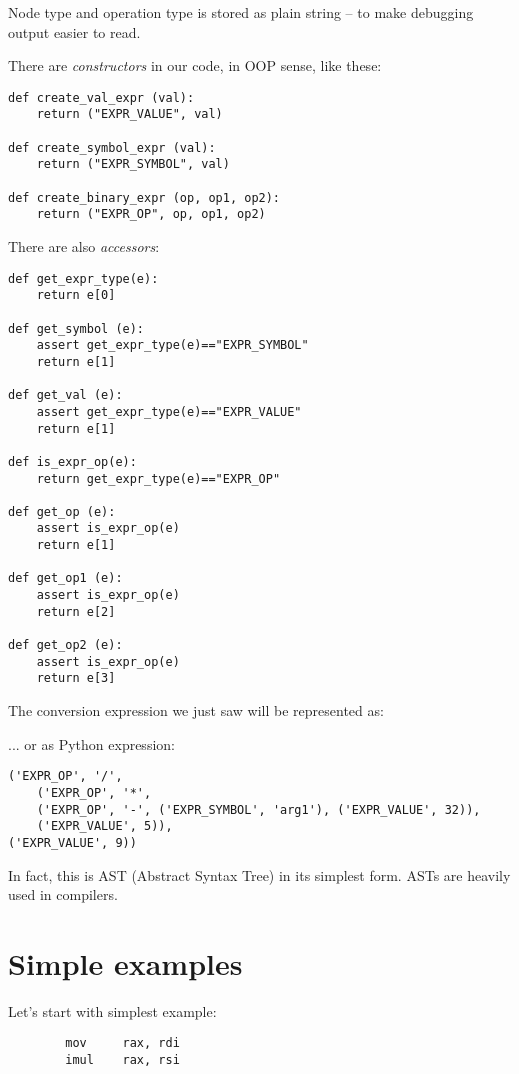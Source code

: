 ﻿\documentclass[12pt]{article}
\begin{document}
Node type and operation type is stored as plain string -- to make debugging output easier to read.

There are \textit{constructors} in our code, in \ac{OOP} sense, like these:

\begin{lstlisting}
def create_val_expr (val):
    return ("EXPR_VALUE", val)

def create_symbol_expr (val):
    return ("EXPR_SYMBOL", val)

def create_binary_expr (op, op1, op2):
    return ("EXPR_OP", op, op1, op2)
\end{lstlisting}

There are also \textit{accessors}:

\begin{lstlisting}
def get_expr_type(e):
    return e[0]

def get_symbol (e):
    assert get_expr_type(e)=="EXPR_SYMBOL"
    return e[1]

def get_val (e):
    assert get_expr_type(e)=="EXPR_VALUE"
    return e[1]

def is_expr_op(e):
    return get_expr_type(e)=="EXPR_OP"

def get_op (e):
    assert is_expr_op(e)
    return e[1]

def get_op1 (e):
    assert is_expr_op(e)
    return e[2]

def get_op2 (e):
    assert is_expr_op(e)
    return e[3]
\end{lstlisting}

The conversion expression we just saw will be represented as:



... or as Python expression:

\begin{lstlisting}
('EXPR_OP', '/', 
	('EXPR_OP', '*',
	('EXPR_OP', '-', ('EXPR_SYMBOL', 'arg1'), ('EXPR_VALUE', 32)), 
	('EXPR_VALUE', 5)), 
('EXPR_VALUE', 9))
\end{lstlisting}

In fact, this is AST (Abstract Syntax Tree) in its simplest form.
ASTs are heavily used in compilers.

\section{Simple examples}

Let's start with simplest example:

\begin{lstlisting}
        mov     rax, rdi
        imul    rax, rsi
\end{lstlisting}
\end{document}

